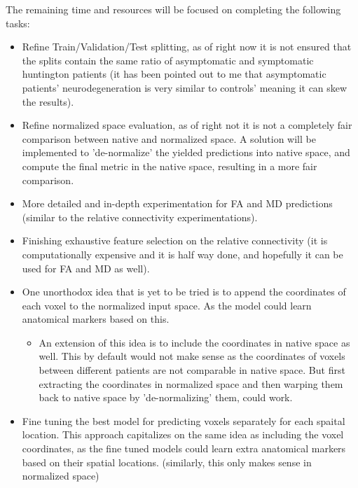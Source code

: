 The remaining time and resources will be focused on completing the following tasks:

\begin{itemize}
  \item Refine Train/Validation/Test splitting, as of right now it is not ensured that the splits contain the same ratio of asymptomatic and symptomatic huntington patients (it has been pointed out to me that asymptomatic patients' neurodegeneration is very similar to controls' meaning it can skew the results).
  \item Refine normalized space evaluation, as of right not it is not a completely fair comparison between native and normalized space. A solution will be implemented to 'de-normalize' the yielded predictions into native space, and compute the final metric in the native space, resulting in a more fair comparison.
  \item More detailed and in-depth experimentation for \ac{FA} and \ac{MD} predictions (similar to the relative connectivity experimentations).
  \item Finishing exhaustive feature selection on the relative connectivity (it is computationally expensive and it is half way done, and hopefully it can be used for FA and MD as well).
  \item One unorthodox idea that is yet to be tried is to append the coordinates of each voxel to the normalized input space. As the model could learn anatomical markers based on this.
  \begin{itemize}
    \item An extension of this idea is to include the coordinates in native space as well. This by default would not make sense as the coordinates of voxels between different patients are not comparable in native space. But first extracting the coordinates in normalized space and then warping them back to native space by 'de-normalizing' them, could work.
  \end{itemize}
  \item Fine tuning the best model for predicting voxels separately for each spaital location. This approach capitalizes on the same idea as including the voxel coordinates, as the fine tuned models could learn extra anatomical markers based on their spatial locations. (similarly, this only makes sense in normalized space)
\end{itemize}
